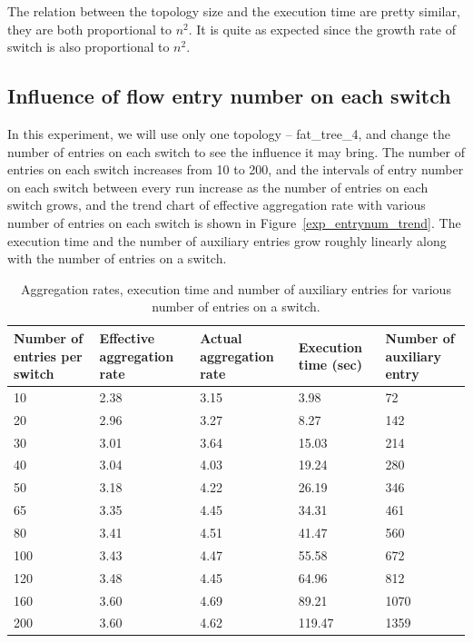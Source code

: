 \documentclass[conference]{IEEEtran}
\begin{document}
The relation between the topology size and the execution time are pretty similar, they are both proportional to $n^2$. It is quite as expected since the growth rate of switch is also proportional to $n^2$.

\subsection{Influence of flow entry number on each switch}
In this experiment, we will use only one topology -- fat\_tree\_4, and change the number of entries on each switch to see the influence it may bring. The number of entries on each switch increases from 10 to 200, and the intervals of entry number on each switch between every run increase as the number of entries on each switch grows, and the trend chart of effective aggregation rate with various number of entries on each switch is shown in Figure~\ref{exp_entrynum_trend}. The execution time and the number of auxiliary entries grow roughly linearly along with the number of entries on a switch.

\begin{table}
\centering
\caption{Aggregation rates, execution time and number of auxiliary entries for various number of entries on a switch.}
\begin{tabular}{|p{1.8cm}|p{1cm}|p{1.3cm}|p{1.1cm}|p{1.3cm}|}
\hline Number of entries per switch & Effective aggregation rate & Actual aggregation rate & Execution time (sec) & Number of auxiliary entry \\
\hline
\hline 10 & 2.38 & 3.15 & 3.98 & 72 \\
\hline 20 & 2.96 & 3.27 & 8.27 & 142 \\
\hline 30 & 3.01 & 3.64 & 15.03 & 214 \\
\hline 40 & 3.04 & 4.03 & 19.24 & 280 \\
\hline 50 & 3.18 & 4.22 & 26.19 & 346 \\
\hline 65 & 3.35 & 4.45 & 34.31 & 461 \\
\hline 80 & 3.41 & 4.51 & 41.47 & 560 \\
\hline 100 & 3.43 & 4.47 & 55.58 & 672 \\
\hline 120 & 3.48 & 4.45 & 64.96 & 812 \\
\hline 160 & 3.60 & 4.69 & 89.21 & 1070 \\
\hline 200 & 3.60 & 4.62 & 119.47 & 1359 \\
\hline 
\end{tabular}
\label{table:different_entry_per_switch}
\end{table}
\end{document}
